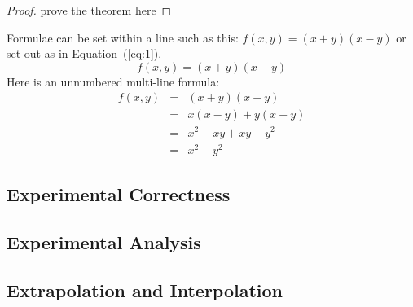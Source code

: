 \documentclass{article}
\begin{document}
\begin{proof}
prove the theorem here
\end{proof}


Formulae can be set within a line such as this: $f(x,y) = (x+y)(x-y)$
or set out as in Equation~(\ref{eq:1}).
\begin{equation}
  \label{eq:1}
  f(x,y) = (x+y)(x-y)
\end{equation}
Here is an unnumbered multi-line formula:
\begin{eqnarray*}
  \label{eq:2}
  f(x,y) &= & (x+y)(x-y) \\
  & = & x(x-y) + y(x-y) \\
  & = & x^2 - xy + xy - y^2 \\
  & = & x^2-y^2
\end{eqnarray*}

\subsection*{Experimental Correctness}


\subsection*{Experimental Analysis}


\subsection*{Extrapolation and Interpolation}
\end{document}
